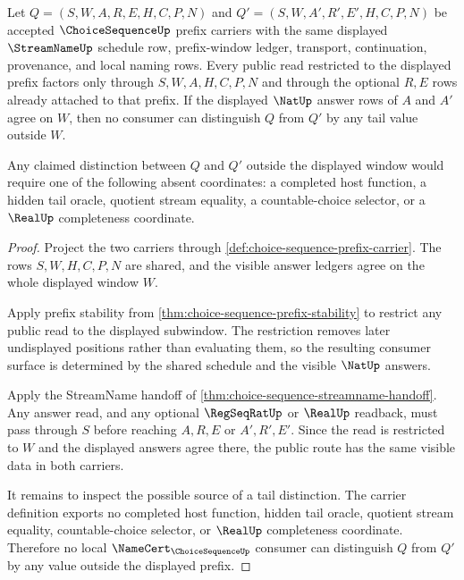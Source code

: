 \begin{theorem}
\label{thm:choice-sequence-tail-nonanticipation}
Let $Q=(S,W,A,R,E,H,C,P,N)$ and $Q'=(S,W,A',R',E',H,C,P,N)$ be accepted $\ChoiceSequenceUp$ prefix carriers with the same displayed $\StreamNameUp$ schedule row, prefix-window ledger, transport, continuation, provenance, and local naming rows. Every public read restricted to the displayed prefix factors only through $S,W,A,H,C,P,N$ and through the optional $R,E$ rows already attached to that prefix. If the displayed $\NatUp$ answer rows of $A$ and $A'$ agree on $W$, then no consumer can distinguish $Q$ from $Q'$ by any tail value outside $W$.

Any claimed distinction between $Q$ and $Q'$ outside the displayed window would require one of the following absent coordinates: a completed host function, a hidden tail oracle, quotient stream equality, a countable-choice selector, or a $\RealUp$ completeness coordinate.
\end{theorem}
\begin{proof}
Project the two carriers through \autoref{def:choice-sequence-prefix-carrier}. The rows $S,W,H,C,P,N$ are shared, and the visible answer ledgers agree on the whole displayed window $W$.

Apply prefix stability from \autoref{thm:choice-sequence-prefix-stability} to restrict any public read to the displayed subwindow. The restriction removes later undisplayed positions rather than evaluating them, so the resulting consumer surface is determined by the shared schedule and the visible $\NatUp$ answers.

Apply the StreamName handoff of \autoref{thm:choice-sequence-streamname-handoff}. Any answer read, and any optional $\RegSeqRatUp$ or $\RealUp$ readback, must pass through $S$ before reaching $A,R,E$ or $A',R',E'$. Since the read is restricted to $W$ and the displayed answers agree there, the public route has the same visible data in both carriers.

It remains to inspect the possible source of a tail distinction. The carrier definition exports no completed host function, hidden tail oracle, quotient stream equality, countable-choice selector, or $\RealUp$ completeness coordinate. Therefore no local $\NameCert_{\ChoiceSequenceUp}$ consumer can distinguish $Q$ from $Q'$ by any value outside the displayed prefix.
\end{proof}

